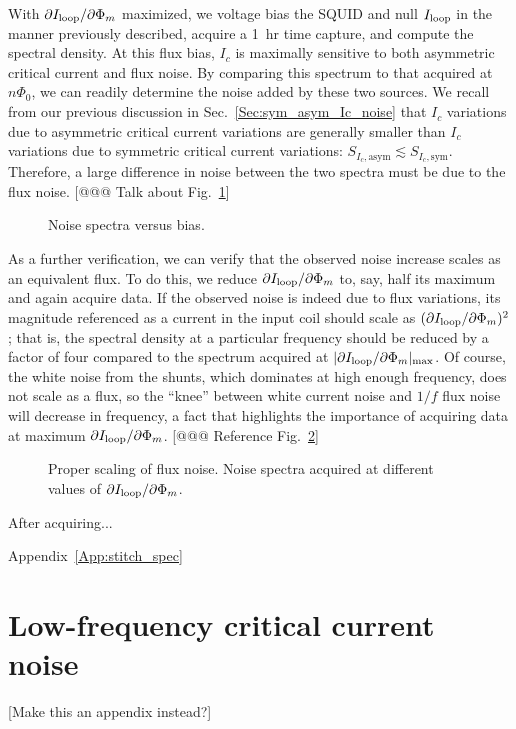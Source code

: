 With $\partial I_\text{loop}/\partial\Phi_m$ maximized, we voltage bias the SQUID and null $I_\text{loop}$ in the manner previously described, acquire a 1~hr time capture, and compute the spectral density. At this flux bias, $I_c$ is maximally sensitive to both asymmetric critical current and flux noise.
By comparing this spectrum to that acquired at $n\Phi_0$, we can readily determine the noise added by these two sources. We recall from our previous discussion in Sec.~\ref{Sec:sym_asym_Ic_noise} that $I_c$ variations due to asymmetric critical current variations are generally smaller than $I_c$ variations due to symmetric critical current variations: $S_{I_c,\text{asym}} \lesssim S_{I_c,\text{sym}}$. Therefore, a large difference in noise between the two spectra must be due to the flux noise. [@@@ Talk about Fig.~\ref{Fig:spectra_vs_bias}]

\begin{figure}
\caption[Blah]{Noise spectra versus bias.}
\label{Fig:spectra_vs_bias}
\end{figure}

As a further verification, we can verify that the observed noise increase scales as an equivalent flux. To do this, we reduce $\partial I_\text{loop}/\partial\Phi_m$ to, say, half its maximum and again acquire data. If the observed noise is indeed due to flux variations, its magnitude referenced as a current in the input coil should scale as $(\partial I_\text{loop}/\partial\Phi_m)^2$; that is, the spectral density at a particular frequency should be reduced by a factor of four compared to the spectrum acquired at $|\partial I_\text{loop}/\partial\Phi_m|_\text{max}$. Of course, the white noise from the shunts, which dominates at high enough frequency, does not scale as a flux, so the ``knee'' between white current noise and $1/f$ flux noise will decrease in frequency, a fact that highlights the importance of acquiring data at maximum $\partial I_\text{loop}/\partial\Phi_m$. [@@@ Reference Fig.~\ref{Fig:spectra_vs_flux_bias}]

\begin{figure}
\caption[Blah]{Proper scaling of flux noise. Noise spectra acquired at different values of $\partial I_\text{loop}/\partial\Phi_m$.}
\label{Fig:spectra_vs_flux_bias}
\end{figure}

After acquiring...

Appendix~\ref{App:stitch_spec}


\section{Low-frequency critical current noise}

[Make this an appendix instead?]








